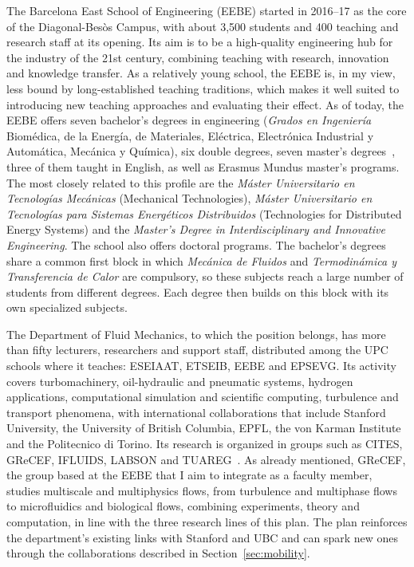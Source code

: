 \documentclass[11pt]{article}
\begin{document}
The Barcelona East School of Engineering (EEBE) started in 2016--17 as the core of the Diagonal-Bes\`os Campus, with about 3,500 students and 400 teaching and research staff at its opening. 
Its aim is to be a high-quality engineering hub for the industry of the 21st century, combining teaching with research, innovation and knowledge transfer. 
As a relatively young school, the EEBE is, in my view, less bound by long-established teaching traditions, which makes it well suited to introducing new teaching approaches and evaluating their effect. 
As of today, the EEBE offers seven bachelor's degrees in engineering (\textit{Grados en Ingenier\'ia} Biom\'edica, de la Energ\'ia, de Materiales, El\'ectrica, Electr\'onica Industrial y Autom\'atica, Mec\'anica y Qu\'imica), six double degrees, seven master's degrees~\cite{EEBEMasters}, three of them taught in English, as well as Erasmus Mundus master's programs. 
The most closely related to this profile are the \textit{M\'aster Universitario en Tecnolog\'ias Mec\'anicas} (Mechanical Technologies), \textit{M\'aster Universitario en Tecnolog\'ias para Sistemas Energ\'eticos Distribuidos} (Technologies for Distributed Energy Systems) and the \emph{Master's Degree in Interdisciplinary and Innovative Engineering}. 
The school also offers doctoral programs. 
The bachelor's degrees share a common first block in which \textit{Mec\'anica de Fluidos} and \textit{Termodin\'amica y Transferencia de Calor} are compulsory, so these subjects reach a large number of students from different degrees. 
Each degree then builds on this block with its own specialized subjects.

The Department of Fluid Mechanics, to which the position belongs, has more than fifty lecturers, researchers and support staff, distributed among the UPC schools where it teaches: ESEIAAT, ETSEIB, EEBE and EPSEVG. Its activity covers turbomachinery, oil-hydraulic and pneumatic systems, hydrogen applications, computational simulation and scientific computing, turbulence and transport phenomena, with international collaborations that include Stanford University, the University of British Columbia, EPFL, the von Karman Institute and the Politecnico di Torino. 
Its research is organized in groups such as CITES, GReCEF, IFLUIDS, LABSON and TUAREG~\cite{MFGroups}. 
As already mentioned, GReCEF, the group based at the EEBE that I aim to integrate as a faculty member, studies multiscale and multiphysics flows, from turbulence and multiphase flows to microfluidics and biological flows, combining experiments, theory and computation, in line with the three research lines of this plan. 
The plan reinforces the department's existing links with Stanford and UBC and can spark new ones through the collaborations described in Section~\ref{sec:mobility}.
\end{document}
